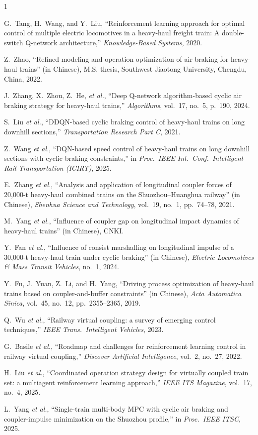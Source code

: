 \documentclass[conference]{IEEEtran}
\begin{document}
\begin{thebibliography}{1}

 G.~Tang, H.~Wang, and Y.~Liu, ``Reinforcement learning
approach for optimal control of multiple electric locomotives in a heavy-haul
freight train: A double-switch Q-network architecture,'' \emph{Knowledge-Based
Systems}, 2020.

 Z.~Zhao, ``Refined modeling and operation optimization of
air braking for heavy-haul trains'' (in Chinese), M.S. thesis, Southwest
Jiaotong University, Chengdu, China, 2022.

 J.~Zhang, X.~Zhou, Z.~He, \emph{et al.}, ``Deep Q-network
algorithm-based cyclic air braking strategy for heavy-haul trains,''
\emph{Algorithms}, vol.~17, no.~5, p.~190, 2024.

 S.~Liu \emph{et al.}, ``DDQN-based cyclic braking control of
heavy-haul trains on long downhill sections,'' \emph{Transportation Research
Part C}, 2021.

 Z.~Wang \emph{et al.}, ``DQN-based speed control of
heavy-haul trains on long downhill sections with cyclic-braking constraints,''
in \emph{Proc.\ IEEE Int.\ Conf.\ Intelligent Rail Transportation (ICIRT)},
2025.

 E.~Zhang \emph{et al.}, ``Analysis and
application of longitudinal coupler forces of 20{,}000-t heavy-haul combined
trains on the Shuozhou--Huanghua railway'' (in Chinese), \emph{Shenhua
Science and Technology}, vol.~19, no.~1, pp.~74--78, 2021.

 M.~Yang \emph{et al.}, ``Influence of coupler gap on
longitudinal impact dynamics of heavy-haul trains'' (in Chinese), CNKI.

 Y.~Fan \emph{et al.}, ``Influence of consist
marshalling on longitudinal impulse of a 30{,}000-t heavy-haul train under
cyclic braking'' (in Chinese), \emph{Electric Locomotives \& Mass Transit
Vehicles}, no.~1, 2024.

 Y.~Fu, J.~Yuan, Z.~Li, and
H.~Yang, ``Driving process optimization of heavy-haul trains based on
coupler-and-buffer constraints'' (in Chinese), \emph{Acta Automatica Sinica},
vol.~45, no.~12, pp.~2355--2365, 2019.

 Q.~Wu \emph{et al.}, ``Railway virtual coupling: a survey of
emerging control techniques,'' \emph{IEEE Trans.\ Intelligent Vehicles}, 2023.

 G.~Basile \emph{et al.}, ``Roadmap and challenges for
reinforcement learning control in railway virtual coupling,'' \emph{Discover
Artificial Intelligence}, vol.~2, no.~27, 2022.

 H.~Liu \emph{et al.}, ``Coordinated operation strategy design
for virtually coupled train set: a multiagent reinforcement learning
approach,'' \emph{IEEE ITS Magazine}, vol.~17, no.~4, 2025.

 L.~Yang \emph{et al.}, ``Single-train multi-body MPC with
cyclic air braking and coupler-impulse minimization on the Shuozhou profile,''
in \emph{Proc.\ IEEE ITSC}, 2025.

\end{thebibliography}
\end{document}
